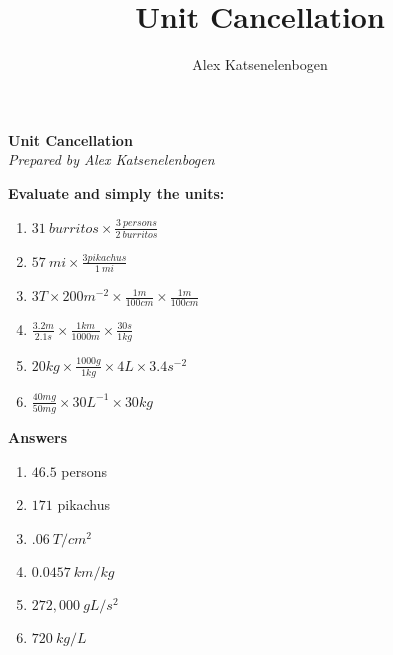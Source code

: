 \documentclass{article}
\title{Unit Cancellation}
\author{Alex Katsenelenbogen}
\begin{document}
\begin{center}
      \Large\textbf{Unit Cancellation}\\
      \large\textit{Prepared by Alex Katsenelenbogen}
   \end{center}


\textbf{Evaluate and simply the units:}
\begin{enumerate}
\item $31\ burritos \times \frac{3\ persons}{2\ burritos}$
\item $57\ mi \times \frac{3 pikachus}{1\ mi}$
\item $3 T \times 200m^{-2} \times \frac{1 m}{100 cm} \times \frac{1 m}{100 cm}$
\item $\frac{3.2m}{2.1s}\times\frac{1km}{1000m}\times\frac{30s}{1kg}$
\item $20 kg \times \frac{1000 g}{1 kg} \times 4L \times 3.4s^{-2}$
\item $\frac{40mg}{50mg}\times30L^{-1}\times30kg$



\end{enumerate}

\pagebreak

\textbf{Answers}

\begin{enumerate}

\item $46.5$ persons
\item $171$ pikachus
\item $.06\ T/cm^{2}$ 
\item $0.0457\ km/kg$
\item $272,000\ gL/s^{2}$ 
\item $720\ kg/L$

\end{enumerate}
\end{document}
